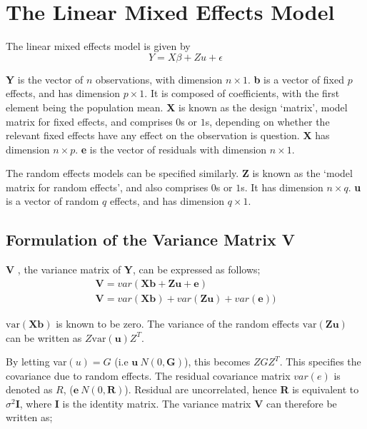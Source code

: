 \documentclass[12pt, a4paper]{report}
\theoremstyle{plain}
\theoremstyle{definition}
\theoremstyle{remark}
\begin{document}
\section{The Linear Mixed Effects Model}
The linear mixed effects model is given by
\begin{equation}
Y = X\beta + Zu + \epsilon
\end{equation}


\textbf{Y} is the vector of $n$ observations, with dimension $n
\times 1$. \textbf{b} is a vector of fixed $p$ effects, and has
dimension $p \times 1$. It is composed of coefficients, with the
first element being the population mean.  \textbf{X} is known as
the design `matrix', model matrix for fixed effects, and comprises
$0$s or $1$s, depending on whether the relevant fixed effects have
any effect on the observation is question. \textbf{X} has
dimension $n \times p$. \textbf{e} is the vector of residuals with
dimension $n \times 1$.

The random effects models can be specified similarly. \textbf{Z}
is known as the `model matrix for random effects', and also
comprises $0$s or $1$s. It has dimension $n \times q$. \textbf{u
}is a vector of random $q$ effects, and has dimension $q \times
1$.


\subsection{Formulation of the Variance Matrix V}
\textbf{V} , the variance matrix of \textbf{Y}, can be expressed
as follows;
\begin{eqnarray}
\textbf{V}= var ( \textbf{Xb} + \textbf{Zu} + \textbf{e})\\
\textbf{V}= var ( \textbf{Xb} ) + var (\textbf{Zu}) +
var(\textbf{e}))
\end{eqnarray}

$\mbox{var}(\textbf{Xb})$ is known to be zero. The variance of the
random effects $\mbox{var}(\textbf{Zu})$ can be written as
$Z\mbox{var}(\textbf{u})Z^{T}$.

By letting var$(u) = G$ (i.e $\textbf{u} ~ N(0,\textbf{G})$), this
becomes $ZGZ^{T}$. This specifies the covariance due to random
effects. The residual covariance matrix $var(e)$ is denoted as
$R$, ($\textbf{e} ~ N(0,\textbf{R})$). Residual are uncorrelated,
hence \textbf{R} is equivalent to $\sigma^{2}$\textbf{I}, where
\textbf{I} is the identity matrix. The variance matrix \textbf{V}
can therefore be written as;
\end{document}
